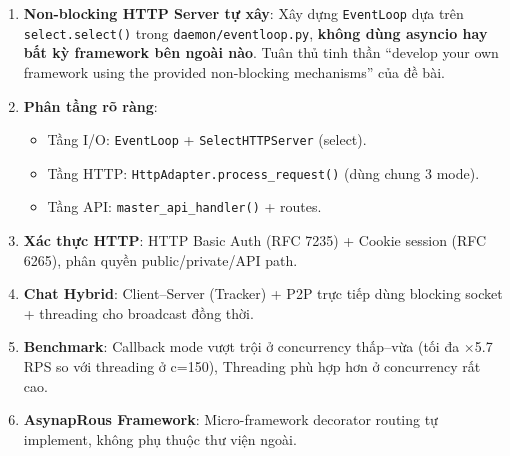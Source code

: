 \documentclass[12pt,a4paper]{article}
\begin{document}
\begin{enumerate}
  \item \textbf{Non-blocking HTTP Server tự xây}: Xây dựng \texttt{EventLoop} dựa trên \texttt{select.select()} trong \texttt{daemon/eventloop.py}, \textbf{không dùng asyncio hay bất kỳ framework bên ngoài nào}. Tuân thủ tinh thần ``develop your own framework using the provided non-blocking mechanisms'' của đề bài.

  \item \textbf{Phân tầng rõ ràng}:
    \begin{itemize}
      \item Tầng I/O: \texttt{EventLoop} + \texttt{SelectHTTPServer} (select).
      \item Tầng HTTP: \texttt{HttpAdapter.process\_request()} (dùng chung 3 mode).
      \item Tầng API: \texttt{master\_api\_handler()} + routes.
    \end{itemize}

  \item \textbf{Xác thực HTTP}: HTTP Basic Auth (RFC 7235) + Cookie session (RFC 6265), phân quyền public/private/API path.

  \item \textbf{Chat Hybrid}: Client--Server (Tracker) + P2P trực tiếp dùng blocking socket + threading cho broadcast đồng thời.

  \item \textbf{Benchmark}: Callback mode vượt trội ở concurrency thấp--vừa (tối đa $\times$5.7 RPS so với threading ở c=150), Threading phù hợp hơn ở concurrency rất cao.

  \item \textbf{AsynapRous Framework}: Micro-framework decorator routing tự implement, không phụ thuộc thư viện ngoài.
\end{enumerate}
\end{document}
